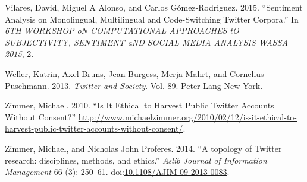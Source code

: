 \documentclass[]{article}
\begin{document}
Vilares, David, Miguel A Alonso, and Carlos G{ó}mez-Rodr{i}guez. 2015.
``Sentiment Analysis on Monolingual, Multilingual and Code-Switching
Twitter Corpora.'' In \emph{6TH WORKSHOP oN COMPUTATIONAL APPROACHES tO
SUBJECTIVITY, SENTIMENT aND SOCIAL MEDIA ANALYSIS WASSA 2015}, 2.

Weller, Katrin, Axel Bruns, Jean Burgess, Merja Mahrt, and Cornelius
Puschmann. 2013. \emph{Twitter and Society}. Vol. 89. Peter Lang New
York.

Zimmer, Michael. 2010. ``Is It Ethical to Harvest Public Twitter
Accounts Without Consent?''
\url{http://www.michaelzimmer.org/2010/02/12/is-it-ethical-to-harvest-public-twitter-accounts-without-consent/}.

Zimmer, Michael, and Nicholas John Proferes. 2014. ``A topology of
Twitter research: disciplines, methods, and ethics.'' \emph{Aslib
Journal of Information Management} 66 (3): 250--61.
doi:\href{http://dx.doi.org/10.1108/AJIM-09-2013-0083}{10.1108/AJIM-09-2013-0083}.
\end{document}
